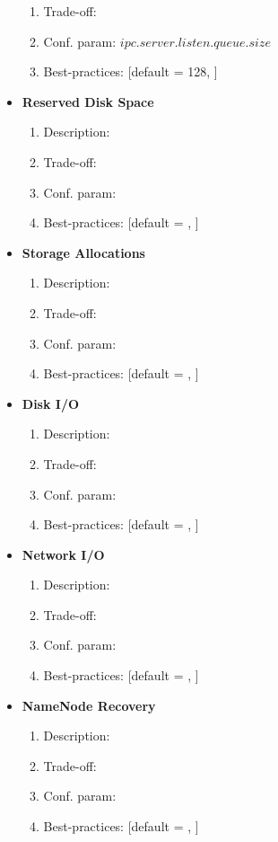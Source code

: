 \begin{itemize}
\begin{enumerate}
			\item Trade-off: 
			\item Conf. param: $ipc.server.listen.queue.size$
			\item Best-practices: [default = 128, ] 
		\end{enumerate}
		\item \textbf{Reserved Disk Space}
		\begin{enumerate}
			\item Description: 
			\item Trade-off: 
			\item Conf. param: $ $
			\item Best-practices: [default = , ] 
		\end{enumerate}
		\item \textbf{Storage Allocations}
		\begin{enumerate}
			\item Description: 
			\item Trade-off: 
			\item Conf. param: $ $
			\item Best-practices: [default = , ] 
		\end{enumerate}
		\item \textbf{Disk I/O}
		\begin{enumerate}
			\item Description: 
			\item Trade-off: 
			\item Conf. param: $ $
			\item Best-practices: [default = , ] 
		\end{enumerate}
		\item \textbf{Network I/O}
		\begin{enumerate}
			\item Description: 
			\item Trade-off: 
			\item Conf. param: $ $
			\item Best-practices: [default = , ] 
		\end{enumerate}
		\item \textbf{NameNode Recovery}
		\begin{enumerate}
			\item Description: 
			\item Trade-off: 
			\item Conf. param: $ $
			\item Best-practices: [default = , ] 
		\end{enumerate}

\end{itemize}
